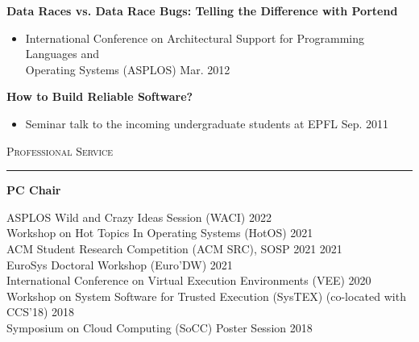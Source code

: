 \documentclass[10pt]{article}
\newcommand{\mysec}[1]{\vspace{2em}\textsc{\large #1}\vspace{1mm}\hrule\vspace{2mm}}
\newcommand{\mysub}[3]{\textbf{#1} {#2} \hfill {\em #3}}
\newcommand{\myssub}[1]{\hspace*{2mm}\parbox{163mm}{#1}\vspace*{2mm}}
\begin{document}
\mysub{Data Races vs. Data Race Bugs: Telling the Difference with Portend}{}{} 
\vspace{-2mm}
\begin{itemize}
\setlength\itemsep{0em}
\item{International Conference on Architectural Support for Programming Languages and \\ Operating Systems (ASPLOS)} \hfill Mar. 2012
\end{itemize}

\mysub{How to Build Reliable Software?}{}{} 
\vspace{-2mm}
\begin{itemize}
\setlength\itemsep{0em}
\item{Seminar talk to the incoming undergraduate students at EPFL} \hfill  Sep. 2011
\end{itemize}


\mysec{Professional Service}


\mysub{PC Chair}{}{}\\
\myssub{\vspace{2mm}
  ASPLOS Wild and Crazy Ideas Session (WACI) \hfill 2022 \\ 
  Workshop on Hot Topics In Operating Systems (HotOS) \hfill 2021 \\
  ACM Student Research Competition (ACM SRC), SOSP 2021 \hfill 2021 \\
  EuroSys Doctoral Workshop (Euro'DW) \hfill 2021 \\
  International Conference on Virtual Execution Environments (VEE) \hfill 2020 \\
  Workshop on System Software for Trusted Execution (SysTEX) (co-located with CCS'18) \hfill 2018 \\
  Symposium on Cloud Computing (SoCC) Poster Session \hfill 2018 \\
}
%

\newpage
\end{document}
